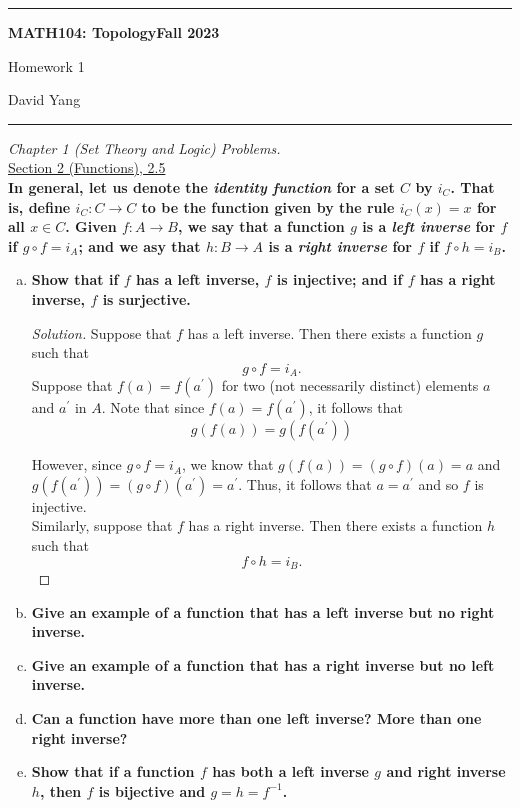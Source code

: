 \documentclass[11pt]{article}
\newenvironment{solution}
  {\renewcommand\qedsymbol{$\blacksquare$}\begin{proof}[Solution]}
  {\end{proof}}
\begin{document}
	\hrule
	\begin{center}
        \textbf{MATH104: Topology}\hfill \textbf{Fall 2023}\newline

		{\Large Homework 1}

		David Yang
	\end{center}

\hrule

\vspace{1em}

\textit{Chapter 1 (Set Theory and Logic) Problems.} \\

\underline{Section 2 (Functions), 2.5} \\

\textbf{In general, let us denote the \textit{identity function} for a set $C$ by $i_C$. That is,
define $i_C \colon C \rightarrow C$ to be the function given by the rule $i_C(x) = x$ for all $x \in C$. Given $f \colon A \rightarrow B$, we say that a function
$g$ is a \textit{left inverse} for $f$ if $g \circ f = i_A$; and we asy that $h \colon B \rightarrow A$ is a \textit{right inverse} for $f$ if
$f \circ h = i_B$.}

\begin{enumerate}[a)]
    \item \textbf{Show that if $f$ has a left inverse, $f$ is injective; and if $f$ has a right inverse, $f$ is surjective.}
    \begin{solution}
    Suppose that $f$ has a left inverse. Then there exists a function $g$ such that 
    \[
      g \circ f = i_A.
    \]
    Suppose that $f(a) = f(a^{\prime})$ for two (not necessarily distinct) elements $a$ and $a^{\prime}$ in $A$. Note that since $f(a) = f(a^{\prime})$, it follows that
    \[
      g(f(a)) = g(f(a^{\prime}))
    \]

    However, since $g \circ f = i_A$, we know that $g(f(a)) = (g \circ f)(a) = a$ and $g(f(a^{\prime})) = (g \circ f)(a^{\prime}) = a^{\prime}$. Thus, it follows that $a = a^{\prime}$
    and so $f$ is injective. \\

    Similarly, suppose that $f$ has a right inverse. Then there exists a function $h$ such that 
    \[
      f \circ h = i_B.
    \]
    
    \end{solution}
    \item \textbf{Give an example of a function that has a left inverse but no right inverse.}
    \item \textbf{Give an example of a function that has a right inverse but no left inverse.}
    \item \textbf{Can a function have more than one left inverse? More than one right inverse?}
    \item \textbf{Show that if a function $f$ has both a left inverse $g$ and right inverse $h$, then $f$ is bijective and $g = h = f^{-1}$.}
\end{enumerate}
\end{document}
